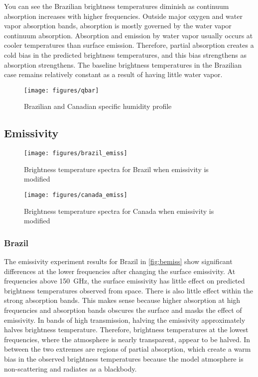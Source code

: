 \documentclass[twocol]{ametsoc}
\begin{document}
You can see the Brazilian brightness temperatures diminish as continuum absorption increases with higher frequencies.
Outside major oxygen and water vapor absorption bands, absorption is mostly governed by the water vapor continuum absorption.
Absorption and emission by water vapor usually occurs at cooler temperatures than surface emission.
Therefore, partial absorption creates a cold bias in the predicted brightness temperatures, and this bias strengthens as absorption strengthens.
The baseline brightness temperatures in the Brazilian case remains relatively constant as a result of having little water vapor.

\begin{figure}
	\centering
	\texttt{[image: figures/qbar]}
	\caption{Brazilian and Canadian specific humidity profile}
	\label{fig:qbar}
\end{figure}

\subsection{Emissivity}


\begin{figure}
	\centering
	\texttt{[image: figures/brazil\_emiss]}
	\caption{Brightness temperature spectra for Brazil when emissivity is modified}
	\label{fig:bemiss}
\end{figure}


\begin{figure}
	\centering
	\texttt{[image: figures/canada\_emiss]}
	\caption{Brightness temperature spectra for Canada when emissivity is modified}
	\label{fig:cemiss}
\end{figure}

\subsubsection{Brazil}

The emissivity experiment results for Brazil in \autoref{fig:bemiss} show significant differences at the lower frequencies after changing the surface emissivity.
At frequencies above 150~GHz, the surface emissivity has little effect on predicted brightness temperatures observed from space.
There is also little effect within the strong absorption bands.
This makes sense because higher absorption at high frequencies and absorption bands obscures the surface and masks the effect of emissivity.
In bands of high transmission, halving the emissivity approximately halves brightness temperature.
Therefore, brightness temperatures at the lowest frequencies, where the atmosphere is nearly transparent, appear to be halved.
In between the two extremes are regions of partial absorption, which create a warm bias in the observed brightness temperatures because the model atmosphere is non-scattering and radiates as a blackbody.
\end{document}
